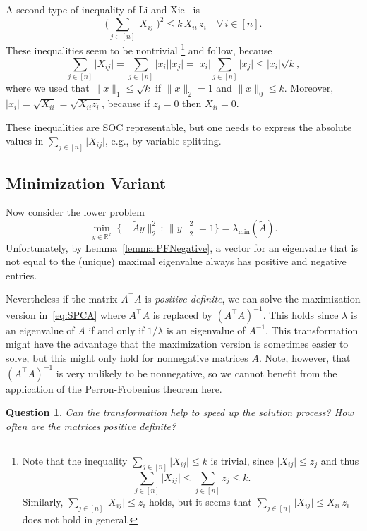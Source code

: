 \documentclass[10pt, a4paper]{article}
\newcommand{\suchthat}{\,:\,}
\newcommand{\abs}[1]{\lvert{#1}\rvert}
\newcommand{\norm}[1]{\lVert{#1}\rVert}
\newcommand{\Norm}[2]{\lVert{#1}\rVert_{#2}}
\newcommand{\T}{^{\top}}
\newcommand{\R}{\mathds{R}}
\newtheorem{question}[theorem]{Question}
\begin{document}
A second type of inequality of Li and Xie~\cite{LiX20} is
\[
  \bigg(\sum_{j \in [n]} \abs{X_{ij}}\bigg)^2 \leq k\, X_{ii}\, z_i\quad
  \forall\, i \in [n].
\]
These inequalities seem to be nontrivial
\footnote{Note that the inequality $\sum_{j \in [n]} \abs{X_{ij}} \leq k$ is trivial,
since $\abs{X_{ij}} \leq z_j$ and thus
\[
  \sum_{j \in [n]} \abs{X_{ij}} \leq \sum_{j \in [n]} z_j \leq k.
\]
Similarly, $\sum_{j \in [n]} \abs{X_{ij}} \leq z_i$ holds, but it seems
that $\sum_{j \in [n]} \abs{X_{ij}} \leq X_{ii}\, z_i$ does not hold in general.}
and follow, because
\[
  \sum_{j \in [n]} \abs{X_{ij}} = \sum_{j \in [n]} \abs{x_i} \abs{x_j} =
  \abs{x_i} \sum_{j \in [n]} \abs{x_j} \leq \abs{x_i} \sqrt{k},
\]
where we used that $\norm{x}_1 \leq \sqrt{k}$ if $\norm{x}_2 = 1$ and
$\norm{x}_0 \leq k$. Moreover, $\abs{x_i} = \sqrt{X_{ii}} = \sqrt{X_{ii}
  z_i}$, because if $z_i = 0$ then $X_{ii} = 0$.

These inequalities are SOC representable, but one needs to express the
absolute values in $\sum_{j \in [n]} \abs{X_{ij}}$, e.g., by variable
splitting.


\subsection{Minimization Variant}

Now consider the lower problem
\[
  \min_{y \in \R^k} \; \{\Norm{\tilde{A}y}{2}^2 \suchthat \Norm{y}{2}^2 =
  1\} = \lambda_{\min}(\tilde{A}).
\]
Unfortunately, by Lemma~\ref{lemma:PFNegative}, a vector for an eigenvalue
that is not equal to the (unique) maximal eigenvalue always has positive
and negative entries.

Nevertheless if the matrix $A\T A$ is \emph{positive definite}, we can
solve the maximization version in~\eqref{eq:SPCA} where $A\T A$ is replaced
by $(A\T A)^{-1}$. This holds since $\lambda$ is an eigenvalue of $A$ if
and only if $1/\lambda$ is an eigenvalue of $A^{-1}$. This transformation
might have the advantage that the maximization version is sometimes easier
to solve, but this might only hold for nonnegative matrices $A$. Note,
however, that $(A\T A)^{-1}$ is very unlikely to be nonnegative, so we
cannot benefit from the application of the Perron-Frobenius theorem here.

\begin{question}
  Can the transformation help to speed up the solution process? How often
  are the matrices positive definite?
\end{question}


\begin{small}
  
  
\end{small}
\end{document}
